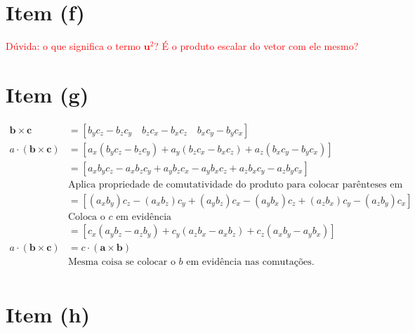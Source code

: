 \section{Item (f)}

\textcolor{red}{Dúvida: o que significa o termo $\mathbf{u}^2$? É o produto escalar do vetor com ele mesmo?
}

\section{Item (g)}

\begin{footnotesize}
\begin{align*}
\mathbf{b} \times \mathbf{c}
&=
\left[
b_y c_z - b_z c_y  \quad
b_z c_x - b_x c_z  \quad
b_x c_y - b_y c_x
\right]
\\[6pt]
a \cdot (\mathbf{b} \times \mathbf{c}) 
&=
\left[
a_x (b_y c_z - b_z c_y) + a_y (b_z c_x - b_x c_z) + a_z (b_x c_y - b_y c_x)
\right]
\\[6pt]
&=
\left[
a_x b_y c_z - a_x b_z c_y + a_y b_z c_x - a_y b_x c_z + a_z b_x c_y - a_z b_y c_x
\right]
\\[6pt]
& \text{Aplica propriedade de comutatividade do produto para colocar parênteses em lugares diferentes}
\\[6pt]
&=
\left[
(a_x b_y) c_z - (a_x b_z) c_y + (a_y b_z) c_x - (a_y b_x) c_z + (a_z b_x) c_y - (a_z b_y) c_x
\right]
\\[6pt]
& \text{Coloca o $c$ em evidência}
\\[6pt]
&=
\left[
c_x (a_y b_z - a_z b_y) + c_y (a_z b_x - a_x b_z) + c_z (a_x b_y - a_y b_x) 
\right]
\\[6pt]
a \cdot (\mathbf{b} \times \mathbf{c})
&=
c \cdot (\mathbf{a} \times \mathbf{b})
\\[6pt]
& \text{Mesma coisa se colocar o $b$ em evidência nas comutações.}
\\[6pt]
\end{align*}
\end{footnotesize}

\section{Item (h)}

